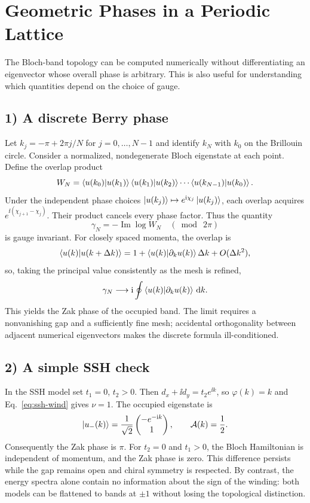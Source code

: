 \section{Geometric Phases in a Periodic Lattice}
The Bloch-band topology can be computed numerically without differentiating an eigenvector whose overall phase is arbitrary. This is also useful for understanding which quantities depend on the choice of gauge.

\subsection*{1) A discrete Berry phase}
Let $k_j=-\pi+2\pi j/N$ for $j=0,\ldots,N-1$ and identify $k_N$ with $k_0$ on the Brillouin circle. Consider a normalized, nondegenerate Bloch eigenstate at each point. Define the overlap product
\begin{equation}
 W_N=\left\langle u(k_0)\middle|u(k_1)\right\rangle\left\langle u(k_1)\middle|u(k_2)\right\rangle
 \cdots\left\langle u(k_{N-1})\middle|u(k_0)\right\rangle.
\end{equation}
Under the independent phase choices $\left|u(k_j)\right\rangle\mapsto e^{\mathrm{i}\chi_j}\left|u(k_j)\right\rangle$, each overlap acquires $e^{\ii(\chi_{j+1}-\chi_j)}$. Their product cancels every phase factor. Thus the quantity
\begin{equation}
 \gamma_N=-\operatorname{Im}\log W_N\quad(\bmod\ 2\pi)
\end{equation}
is gauge invariant. For closely spaced momenta, the overlap is
\begin{equation}
 \left\langle u(k)\middle|u(k+\Delta k)\right\rangle=1+
 \left\langle u(k)\middle|\partial_k u(k)\right\rangle\Delta k+O(\Delta k^2),
\end{equation}
so, taking the principal value consistently as the mesh is refined,
\begin{equation}
 \gamma_N\longrightarrow \mathrm{i}\oint\left\langle u(k)\middle|\partial_k u(k)\right\rangle\,\mathrm{d} k.
\end{equation}
This yields the Zak phase of the occupied band. The limit requires a nonvanishing gap and a sufficiently fine mesh; accidental orthogonality between adjacent numerical eigenvectors makes the discrete formula ill-conditioned.

\subsection*{2) A simple SSH check}
In the SSH model set $t_1=0$, $t_2>0$. Then $d_x+\ii d_y=t_2e^{\ii k}$, so $\varphi(k)=k$ and Eq.~\eqref{eq:ssh-wind} gives $\nu=1$. The occupied eigenstate is
\begin{equation}
 \left|u_-(k)\right\rangle=\frac1{\sqrt2}\begin{pmatrix}-e^{-\mathrm{i} k}\\1\end{pmatrix},
 \qquad\mathcal A(k)=\frac12.
\end{equation}
Consequently the Zak phase is $\pi$. For $t_2=0$ and $t_1>0$, the Bloch Hamiltonian is independent of momentum, and the Zak phase is zero. This difference persists while the gap remains open and chiral symmetry is respected. By contrast, the energy spectra alone contain no information about the sign of the winding: both models can be flattened to bands at $\pm1$ without losing the topological distinction.


